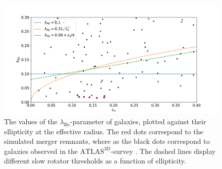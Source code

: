 \documentclass[english, oneside]{HYgradu}
\begin{document}
\begin{figure}[h]
	\centering
	\includegraphics[width=\textwidth]{lambda_epsilon.png}
	\caption{The values of the $\lambda_{\mathrm{Re}}$-parameter of galaxies, plotted against their ellipticity at the effective radius. The red dots correspond to the simulated merger remnants, where as the black dots correspond to galaxies observed in the $\mathrm{ATLAS^{3D}}$-survey \citep{Emsellem2011}. The dashed lines display different slow rotator thresholds as a function of ellipticity.}
\end{figure}
\end{document}

